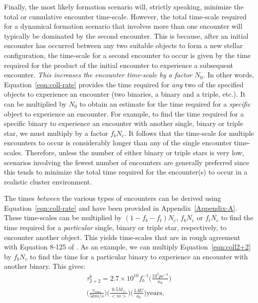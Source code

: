 \begin{enumerate}
Finally, the most likely formation scenario will, strictly speaking, 
minimize the total or cumulative encounter time-scale.  However, the
total time-scale required for a dynamical 
formation scenario that involves more than one encounter will
typically be dominated by the second encounter.  This is because,
after an initial encounter has occurred between any two suitable
objects to form a new stellar configuration, the time-scale for a
second encounter to occur is given by the time required for
the product of the initial encounter to experience a
subsequent encounter.  \textit{This increases the encounter time-scale
  by a factor $N_0$.}  In other words, 
Equation~\ref{eqn:coll-rate} provides the time required for
\textit{any} two of the specified objects to experience an
encounter (two binaries, a binary and a triple, etc.).  It can be
multiplied by $N_0$ to obtain an estimate for the time
required for a \textit{specific} object to experience an encounter.
For example, to find the time required for a specific binary to
experience an encounter with another single, binary or triple star, we
must multiply by a factor $f_bN_c$.  It follows that the 
time-scale for multiple encounters to occur is considerably longer than
any of the single encounter time-scales.  Therefore, unless the number
of either binary or triple stars is very low, 
scenarios involving the fewest number of encounters are generally
preferred since this tends to minimize the total time required for
the encounter(s) to occur in a realistic cluster environment.  

The times \textit{between} the various types of encounters can be
derived using Equation~\ref{eqn:coll-rate} and have been provided in
Appendix~\ref{Appendix-A}.  These time-scales can be multiplied by
$(1-f_b-f_t)N_c$, $f_bN_c$ or $f_tN_c$ to find the time required for a
\textit{particular} single, binary or triple star, respectively, to
encounter another object.  This yields time-scales that are in rough
agreement with Equation 8-125 of \citet{binney87}.  As an example, we
can multiply Equation~\ref{eqn:coll2+2} by $f_bN_c$ to find the time
for a particular binary to experience an encounter with another
binary.  This gives:
\begin{equation}
\begin{gathered}
\label{eqn:tau-2-22}
\tau^b_{2+2} = 2.7 \times 10^{10}f_b^{-1} \Big(\frac{10^3
  pc^{-3}}{n_0}\Big) \\
\Big(\frac{v_{rms}}{5 km/s}\Big)\Big(\frac{0.5
  M_{\odot}}{<m>}\Big)\Big(\frac{1
  AU}{a_{b}}\Big) \mbox{years},
\end{gathered}
\end{equation}


\end{enumerate}
